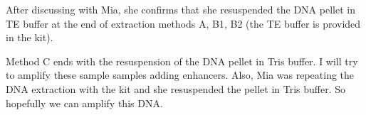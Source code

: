 After discussing with Mia, she confirms that she resuspended the DNA pellet in TE buffer at the end of extraction methods A, B1, B2 (the TE buffer is provided in the kit).


Method C ends with the resuspension of the DNA pellet in Tris buffer. I will try to amplify these sample samples adding enhancers. Also, Mia was repeating the DNA extraction with the kit and she resuspended the pellet in Tris buffer. So hopefully we can amplify this DNA.

